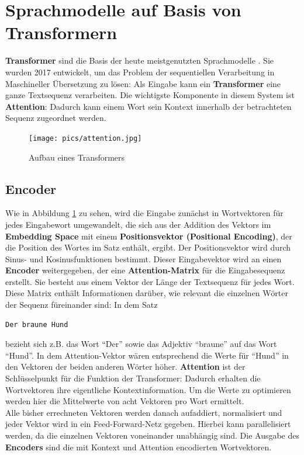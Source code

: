 \section{Sprachmodelle auf Basis von Transformern}
\textbf{Transformer} sind die Basis der heute meistgenutzten Sprachmodelle \cite{bert}\cite{gpt}. Sie wurden 2017 entwickelt, um das Problem der sequentiellen Verarbeitung in Maschineller \"Ubersetzung zu l\"osen: Als Eingabe kann ein \textbf{Transformer} eine ganze Textsequenz verarbeiten. Die wichtigste Komponente in diesem System ist \textbf{Attention}: Dadurch kann einem Wort sein Kontext innerhalb der betrachteten Sequenz zugeordnet werden.\\
\begin{figure}[!ht]
\centering
\texttt{[image: pics/attention.jpg]}
\caption{Aufbau eines Transformers \cite{attention}}
\label{fig:attention}
\end{figure}

\subsection*{Encoder}
Wie in Abbildung \ref{fig:attention} zu sehen, wird die Eingabe zun\"achst in Wortvektoren f\"ur jedes Eingabewort umgewandelt, die sich aus der Addition des Vektors im \textbf{Embedding Space} mit einem \textbf{Positionsvektor (Positional Encoding)}, der die Position des Wortes im Satz enth\"alt, ergibt. Der Positionsvektor wird durch Sinus- und Kosinusfunktionen bestimmt. Dieser Eingabevektor wird an einen \textbf{Encoder} weitergegeben, der eine \textbf{Attention-Matrix} f\"ur die Eingabesequenz erstellt. Sie besteht aus einem Vektor der L\"ange der Textsequenz f\"ur jedes Wort. Diese Matrix enth\"alt Informationen dar\"uber, wie relevant die einzelnen W\"orter der Sequenz f\"ureinander sind: In dem Satz
\begin{verbatim} 
Der braune Hund
\end{verbatim} 
bezieht sich z.B. das Wort "`Der"' sowie das Adjektiv "`braune"' auf das Wort "`Hund"'. In dem Attention-Vektor w\"aren entsprechend die Werte f\"ur "`Hund"' in den Vektoren der beiden anderen W\"orter h\"oher. \textbf{Attention} ist der Schl\"usselpunkt f\"ur die Funktion der Transformer: Dadurch erhalten die Wortvektoren ihre eigentliche Kontextinformation. Um die Werte zu optimieren werden hier die Mittelwerte von acht Vektoren pro Wort ermittelt.\\
Alle bisher errechneten Vektoren werden danach aufaddiert, normalisiert und jeder Vektor wird in ein Feed-Forward-Netz gegeben. Hierbei kann parallelisiert werden, da die einzelnen Vektoren voneinander unabh\"angig sind. Die Ausgabe des \textbf{Encoders} sind die mit Kontext und Attention encodierten Wortvektoren.\\


